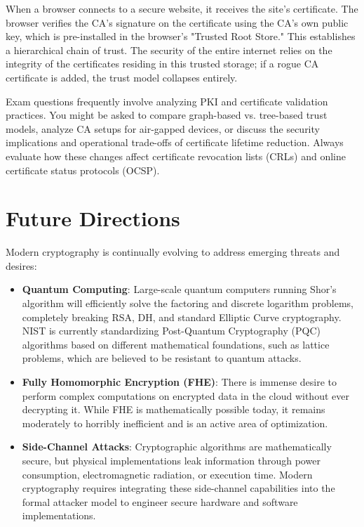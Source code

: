 When a browser connects to a secure website, it receives the site's certificate. The browser verifies the CA's signature on the certificate using the CA's own public key, which is pre-installed in the browser's "Trusted Root Store." This establishes a hierarchical chain of trust. The security of the entire internet relies on the integrity of the certificates residing in this trusted storage; if a rogue CA certificate is added, the trust model collapses entirely.

\begin{tcolorbox}[colback=blue!5!white,colframe=blue!75!black,title=Exam Insight]
Exam questions frequently involve analyzing PKI and certificate validation practices. You might be asked to compare graph-based vs. tree-based trust models, analyze CA setups for air-gapped devices, or discuss the security implications and operational trade-offs of certificate lifetime reduction. Always evaluate how these changes affect certificate revocation lists (CRLs) and online certificate status protocols (OCSP).
\end{tcolorbox}

\section{Future Directions}

Modern cryptography is continually evolving to address emerging threats and desires:
\begin{itemize}
    \item \textbf{Quantum Computing}: Large-scale quantum computers running Shor's algorithm will efficiently solve the factoring and discrete logarithm problems, completely breaking RSA, DH, and standard Elliptic Curve cryptography. NIST is currently standardizing Post-Quantum Cryptography (PQC) algorithms based on different mathematical foundations, such as lattice problems, which are believed to be resistant to quantum attacks.
    \item \textbf{Fully Homomorphic Encryption (FHE)}: There is immense desire to perform complex computations on encrypted data in the cloud without ever decrypting it. While FHE is mathematically possible today, it remains moderately to horribly inefficient and is an active area of optimization.
    \item \textbf{Side-Channel Attacks}: Cryptographic algorithms are mathematically secure, but physical implementations leak information through power consumption, electromagnetic radiation, or execution time. Modern cryptography requires integrating these side-channel capabilities into the formal attacker model to engineer secure hardware and software implementations.
\end{itemize}

